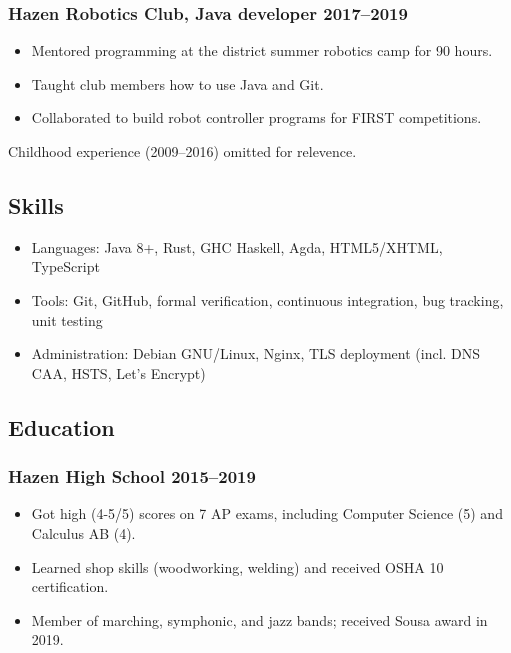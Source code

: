 \documentclass[12pt]{extarticle}
\begin{document}
\subsubsection{Hazen Robotics Club, Java developer \hfill 2017–2019}
\begin{itemize}
\item Mentored programming at the district summer robotics camp for 90 hours.
\item Taught club members how to use Java and Git.
\item Collaborated to build robot controller programs for FIRST competitions.
\end{itemize}

{\tiny Childhood experience (2009–2016) omitted for relevence.}

\subsection{Skills}
\begin{itemize}
\item Languages: Java 8+, Rust, GHC Haskell, Agda, HTML5/XHTML, TypeScript
\item Tools: Git, GitHub, formal verification, continuous integration, bug tracking, unit testing
\item Administration: Debian GNU/Linux, Nginx, TLS deployment (incl. DNS CAA, HSTS, Let's Encrypt)
\end{itemize}


\subsection{Education}
\subsubsection{Hazen High School \hfill 2015–2019}
\begin{itemize}
\item Got high (4-5/5) scores on 7 AP exams, including Computer Science (5) and Calculus AB (4).
\item Learned shop skills (woodworking, welding) and received OSHA 10 certification.
\item Member of marching, symphonic, and jazz bands; received Sousa award in 2019.
\end{itemize}
\end{document}
